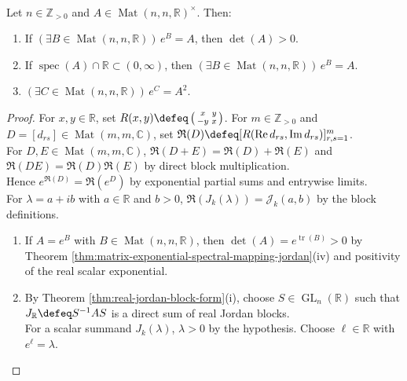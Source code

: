 \begin{proposition} \label{prop:real-matrix-logarithm-sufficient-conditions} \\
Let $n\in\mathbb{Z}_{>0}$ and $A\in\operatorname{Mat}(n,n,\mathbb{R})^{\times}$. Then:
\begin{enumerate}[label=(\roman*)]
\setlength{\itemsep}{0pt}
\item If $(\exists B\in\operatorname{Mat}(n,n,\mathbb{R}))\,e^B=A$, then $\det(A)>0$.
\item If $\operatorname{spec}(A)\cap\mathbb{R}\subset(0,\infty)$, then $(\exists B\in\operatorname{Mat}(n,n,\mathbb{R}))\,e^B=A$.
\item $(\exists C\in\operatorname{Mat}(n,n,\mathbb{R}))\,e^C=A^2$.
\end{enumerate}
\begin{proof}
For $x,y\in\mathbb{R}$, set $R(x,y)\defeq\left(\begin{smallmatrix}x&y\\-y&x\end{smallmatrix}\right)$. For $m\in\mathbb{Z}_{>0}$ and $D=[d_{rs}]\in\operatorname{Mat}(m,m,\mathbb{C})$, set $\mathfrak{R}(D)\defeq[R(\operatorname{Re}d_{rs},\operatorname{Im}d_{rs})]_{r,s=1}^m$.\\
For $D,E\in\operatorname{Mat}(m,m,\mathbb{C})$, $\mathfrak{R}(D+E)=\mathfrak{R}(D)+\mathfrak{R}(E)$ and $\mathfrak{R}(DE)=\mathfrak{R}(D)\mathfrak{R}(E)$ by direct block multiplication.\\
Hence $e^{\mathfrak{R}(D)}=\mathfrak{R}(e^D)$ by exponential partial sums and entrywise limits.\\
For $\lambda=a+ib$ with $a\in\mathbb{R}$ and $b>0$, $\mathfrak{R}(J_k(\lambda))=\mathcal{J}_k(a,b)$ by the block definitions.
\begin{enumerate}[label=(\roman*)]
\setlength{\itemsep}{0pt}
\item If $A=e^B$ with $B\in\operatorname{Mat}(n,n,\mathbb{R})$, then $\det(A)=e^{\operatorname{tr}(B)}>0$ by Theorem \ref{thm:matrix-exponential-spectral-mapping-jordan}(iv) and positivity of the real scalar exponential.
\item By Theorem \ref{thm:real-jordan-block-form}(i), choose $S\in\operatorname{GL}_n(\mathbb{R})$ such that $J_{\mathbb{R}}\defeq S^{-1}AS$ is a direct sum of real Jordan blocks.\\
For a scalar summand $J_k(\lambda)$, $\lambda>0$ by the hypothesis. Choose $\ell\in\mathbb{R}$ with $e^{\ell}=\lambda$.\\

\end{enumerate}
\end{proof}
\end{proposition}
